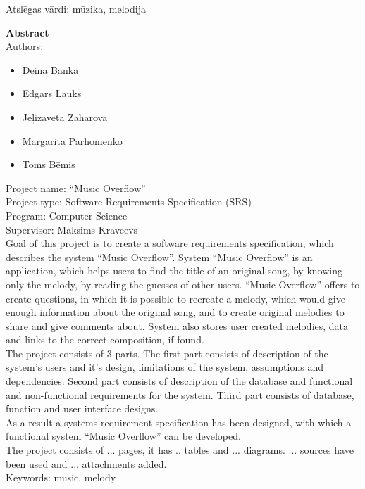 \documentclass[12pt]{article}
\begin{document}
Atslēgas vārdi: mūzika, melodija

\pagebreak

\textbf{\large Abstract}\\
\indent Authors:
\begin{itemize}
	\setlength{\itemsep}{0em}
	\item Deina Banka
	\item Edgars Lauks
	\item Jeļizaveta Zaharova
	\item Margarita Parhomenko
	\item Toms Bēmis
\end{itemize}

Project name: ``Music Overflow''\\
Project type: Software Requirements Specification (SRS)\\
Program: Computer Science\\
Supervisor: Maksims Kravcevs\\

Goal of this project is to create a software requirements specification, which describes the system ``Music Overflow''. System ``Music Overflow'' is an application, which helps users to find the title of an original song, by knowing only the melody, by reading the guesses of other users. ``Music Overflow'' offers to create questions, in which it is possible to recreate a melody, which would give enough information about the original song, and to create original melodies to share and give comments about. System also stores user created melodies, data and links to the correct composition, if found.\\
\indent The project consists of 3 parts. The first part consists of description of the system's users and it's design, limitations of the system, assumptions and dependencies. Second part consists of description of the database and functional and non-functional requirements for the system. Third part consists of database, function and user interface designs.\\
\indent As a result a systems requirement specification has been designed, with which a functional system ``Music Overflow'' can be developed.\\
\indent The project consists of ... pages, it has .. tables and ... diagrams. ... sources have been used and ... attachments added.\\
\indent Keywords: music, melody

\pagebreak

\tableofcontents
\end{document}
